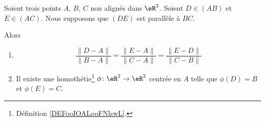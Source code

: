\begin{theorem}     \label{THOooFMMLooLmAnAd}
	Soient trois points \( A\), \( B\), \( C\) non alignés dans \( \eR^2\). Soient \( D\in (AB)\) et \( E\in (AC)\). Nous supposons que \( (DE)\) est parallèle à \( BC\).

	Alors
	\begin{enumerate}
		\item
		      \begin{equation}		\label{EQooRDBYooEXWwGl}
			      \frac{ \| D-A \| }{ \| B-A \| }=\frac{ \| E-A \| }{ \| C-A \| }=\frac{ \| E-D \| }{ \| C-B \| }
		      \end{equation}
		\item
		      Il existe une homothétie\footnote{Définition \ref{DEFooIOALooFNlswL}.} \( \phi\colon \eR^2\to \eR^2\) centrée en \( A\) telle que \( \phi(D)=B\) et \( \phi(E)=C\).
	\end{enumerate}
\end{theorem}

